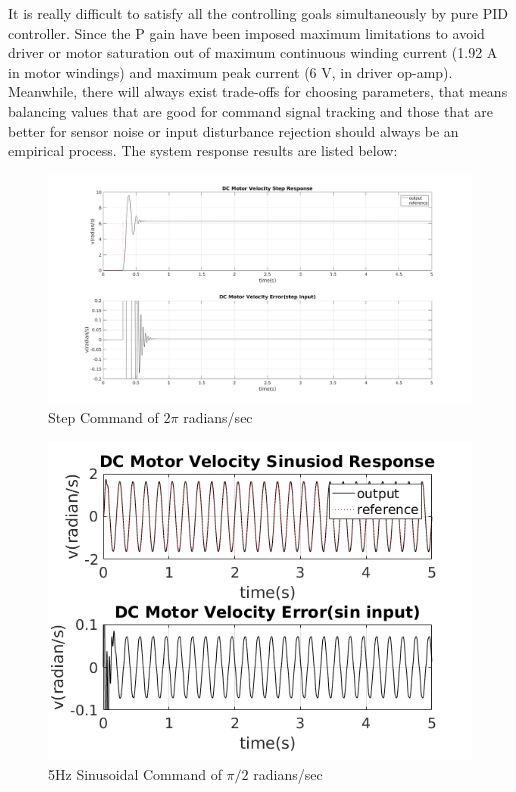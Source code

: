 \documentclass[letterpaper]{article}
\begin{document}
It is really difficult to satisfy all the controlling goals simultaneously by pure PID controller. Since the P gain have been imposed maximum limitations to avoid driver or motor saturation out of maximum continuous winding current (1.92 A in motor windings) and maximum peak current (6 V, in driver op-amp). Meanwhile, there will always exist trade-offs for choosing parameters, that means balancing values that are good for command signal tracking and those that are better for sensor noise or input disturbance rejection should always be an empirical process. The system response results are listed below:

\begin{figure}[H]
\begin{center}
\includegraphics[scale=0.31]{velocity_step.png}
\caption{Step Command of $2\pi$ radians/sec}
\label{q3_12}
\end{center}
\end{figure}
\begin{figure}[H]
\centering
\includegraphics[scale=1]{velocity_sine_5.png}
\caption{5Hz Sinusoidal Command of $\pi/2$ radians/sec}
\label{q3_13}
\end{figure}
\end{document}
